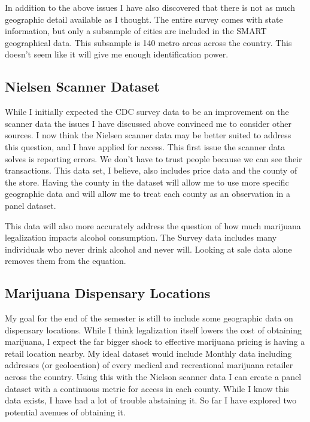 \documentclass[11pt]{article}
\begin{document}
 In addition to the above issues I have also discovered that there is not as much geographic detail available as I thought. The entire survey comes with state information, but only a subsample of cities are included in the SMART geographical data. This subsample is 140 metro areas across the country. This doesn't seem like it will give me enough identification power.

\subsection{Nielsen Scanner Dataset}

While I initially expected the CDC survey data to be an improvement on the scanner data the issues I have discussed above convinced me to consider other sources.  I now think the Nielsen scanner data may be better suited to address this question, and I have applied for access. This first issue the scanner data solves is reporting errors. We don't have to trust people because we can see their transactions. This data set, I believe, also includes price data and the county of the store. Having the county in the dataset will allow me to use more specific geographic data and will allow me to treat each county as an observation in a panel dataset. \par

This data will also more accurately address the question of how much marijuana legalization impacts alcohol consumption. The Survey data includes many individuals who never drink alcohol and never will. Looking at sale data alone removes them from the equation.  \par 


\subsection{Marijuana Dispensary Locations}

My goal for the end of the semester is still to include some geographic data on dispensary locations. While I think legalization itself lowers the cost of obtaining marijuana, I expect the far bigger shock to effective marijuana pricing is having a retail location nearby. My ideal dataset would include Monthly data including addresses (or geolocation) of every medical and recreational marijuana retailer across the country. Using this with the Nielson scanner data I can create a panel dataset with a continuous metric for access in each county. While I know this data exists, I have had a lot of trouble abstaining it. So far I have explored two potential avenues of obtaining it. \par
\end{document}
